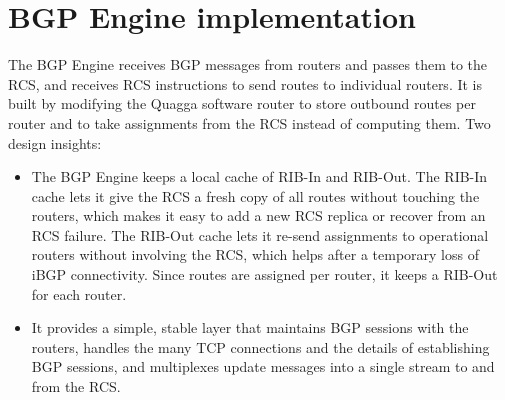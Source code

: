 \section{BGP Engine implementation}
The BGP Engine receives BGP messages from routers and passes them to the RCS, and receives RCS instructions to send routes to individual routers. It is built by modifying the Quagga software router to store outbound routes per router and to take assignments from the RCS instead of computing them. Two design insights:
\begin{itemize}
\item {} The BGP Engine keeps a local cache of RIB-In and RIB-Out. The RIB-In cache lets it give the RCS a fresh copy of all routes without touching the routers, which makes it easy to add a new RCS replica or recover from an RCS failure. The RIB-Out cache lets it re-send assignments to operational routers without involving the RCS, which helps after a temporary loss of iBGP connectivity. Since routes are assigned per router, it keeps a RIB-Out for each router.
\item {} It provides a simple, stable layer that maintains BGP sessions with the routers, handles the many TCP connections and the details of establishing BGP sessions, and multiplexes update messages into a single stream to and from the RCS.
\end{itemize}


